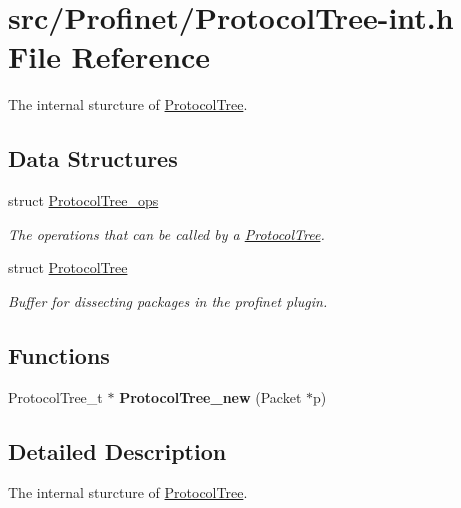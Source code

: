 \hypertarget{_protocol_tree-int_8h}{}\section{src/\+Profinet/\+Protocol\+Tree-\/int.h File Reference}
\label{_protocol_tree-int_8h}


The internal sturcture of \hyperlink{struct_protocol_tree}{Protocol\+Tree}.  


\subsection*{Data Structures}
\begin{DoxyCompactItemize}
\item 
struct \hyperlink{struct_protocol_tree__ops}{Protocol\+Tree\+\_\+ops}
\begin{DoxyCompactList}\small\item\em The operations that can be called by a \hyperlink{struct_protocol_tree}{Protocol\+Tree}. \end{DoxyCompactList}\item 
struct \hyperlink{struct_protocol_tree}{Protocol\+Tree}
\begin{DoxyCompactList}\small\item\em Buffer for dissecting packages in the profinet plugin. \end{DoxyCompactList}\end{DoxyCompactItemize}
\subsection*{Functions}
\begin{DoxyCompactItemize}
\item 
\hypertarget{_protocol_tree-int_8h_ad95344166c369a93bf4be9c0b894efc2}{}Protocol\+Tree\+\_\+t $\ast$ {\bfseries Protocol\+Tree\+\_\+new} (Packet $\ast$p)\label{_protocol_tree-int_8h_ad95344166c369a93bf4be9c0b894efc2}

\end{DoxyCompactItemize}


\subsection{Detailed Description}
The internal sturcture of \hyperlink{struct_protocol_tree}{Protocol\+Tree}. 

